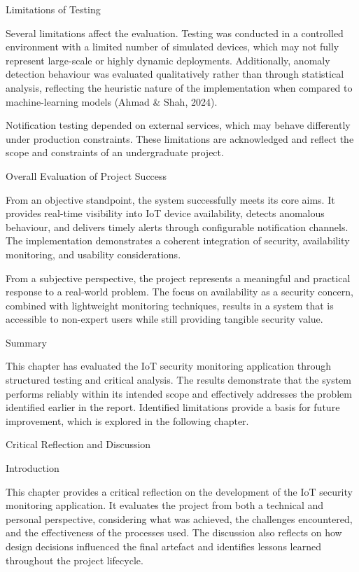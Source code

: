 Limitations of Testing

Several limitations affect the evaluation. Testing was conducted in a controlled environment with a limited number of simulated devices, which may not fully represent large-scale or highly dynamic deployments. Additionally, anomaly detection behaviour was evaluated qualitatively rather than through statistical analysis, reflecting the heuristic nature of the implementation when compared to machine-learning models (Ahmad \& Shah, 2024).

Notification testing depended on external services, which may behave differently under production constraints. These limitations are acknowledged and reflect the scope and constraints of an undergraduate project.

Overall Evaluation of Project Success

From an objective standpoint, the system successfully meets its core aims. It provides real-time visibility into IoT device availability, detects anomalous behaviour, and delivers timely alerts through configurable notification channels. The implementation demonstrates a coherent integration of security, availability monitoring, and usability considerations.

From a subjective perspective, the project represents a meaningful and practical response to a real-world problem. The focus on availability as a security concern, combined with lightweight monitoring techniques, results in a system that is accessible to non-expert users while still providing tangible security value.

Summary

This chapter has evaluated the IoT security monitoring application through structured testing and critical analysis. The results demonstrate that the system performs reliably within its intended scope and effectively addresses the problem identified earlier in the report. Identified limitations provide a basis for future improvement, which is explored in the following chapter.

Critical Reflection and Discussion

Introduction

This chapter provides a critical reflection on the development of the IoT security monitoring application. It evaluates the project from both a technical and personal perspective, considering what was achieved, the challenges encountered, and the effectiveness of the processes used. The discussion also reflects on how design decisions influenced the final artefact and identifies lessons learned throughout the project lifecycle.

